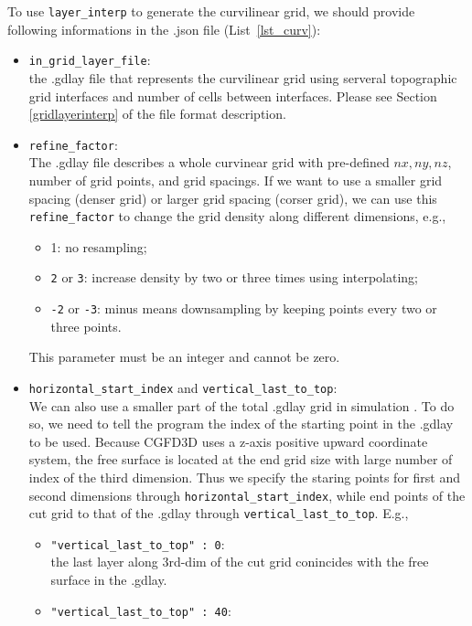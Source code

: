 To use \verb|layer_interp| to generate the curvilinear grid,
we should provide following informations in the .json file (List~\ref{lst_curv}):
\begin{itemize}
  \item \verb|in_grid_layer_file|: \\
    the .gdlay file that represents the curvilinear grid using
      serveral topographic grid interfaces and number of cells between interfaces.
      Please see Section \ref{gridlayerinterp} of the file format description. 
  \item \verb|refine_factor|: \\
      The .gdlay file describes a whole curvinear grid with 
      pre-defined $nx,ny,nz$, number of grid points, and grid spacings.
      If we want to use a smaller grid spacing (denser grid) or larger grid spacing (corser grid),
      we can use this \verb|refine_factor| to change the grid density along different dimensions, e.g.,
      \begin{itemize}
        \item 1: no resampling;
        \item \texttt{2} or \texttt{3}: increase density by two or three times using interpolating;
        \item \texttt{-2} or \texttt{-3}: minus means downsampling by keeping points 
              every two or three points.
      \end{itemize}
      This parameter must be an integer and cannot be zero.
  \item \verb|horizontal_start_index| and \verb|vertical_last_to_top|: \\ 
    We can also use a smaller part of the total .gdlay grid in simulation .
    To do so, we need to tell the program the index of the starting point in the .gdlay to be used.
    Because CGFD3D uses a z-axis positive upward coordinate system, 
    the free surface is located at the end grid size with large number of index of the third dimension.
    Thus we specify the staring points for first and second dimensions through \verb|horizontal_start_index|, 
    while end points of the cut grid to that of the .gdlay through \verb|vertical_last_to_top|.
    E.g.,
    \begin{itemize}
      \item \verb|"vertical_last_to_top" : 0|: \\
          the last layer along 3rd-dim of the cut grid conincides with the free surface in the .gdlay.
      \item \verb|"vertical_last_to_top" : 40|: \\

\end{itemize}
\end{itemize}
